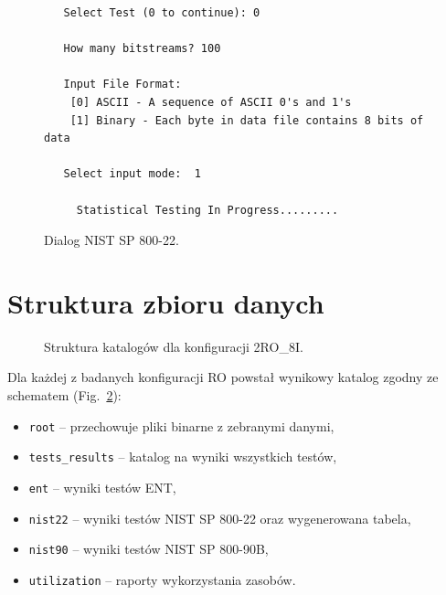 \begin{figure}[H]
\begin{verbatim}
   Select Test (0 to continue): 0

   How many bitstreams? 100

   Input File Format:
    [0] ASCII - A sequence of ASCII 0's and 1's
    [1] Binary - Each byte in data file contains 8 bits of data

   Select input mode:  1

     Statistical Testing In Progress.........
    \end{verbatim}
    \caption{Dialog NIST SP 800-22.}
    \label{fig:B_dialog_nist_22}
\end{figure}

\section{Struktura zbioru danych}

\begin{figure}[H]
    \centering
    \begin{minipage}{0.6\textwidth} 
    \end{minipage}
    \caption{Struktura katalogów dla konfiguracji 2RO\_8I.}
    \label{fig:B_dir_tree}
\end{figure}

Dla każdej z badanych konfiguracji RO powstał wynikowy katalog zgodny ze schematem 
(Fig.~\ref{fig:B_dir_tree}):

\begin{itemize}
    \item \texttt{root} -- przechowuje pliki binarne z zebranymi danymi,
    \item \texttt{tests\_results} -- katalog na wyniki wszystkich testów,
    \item \texttt{ent} -- wyniki testów ENT,
    \item \texttt{nist22} -- wyniki testów NIST SP 800-22 oraz wygenerowana tabela,
    \item \texttt{nist90} -- wyniki testów NIST SP 800-90B,
    \item \texttt{utilization} -- raporty wykorzystania zasobów.
\end{itemize}


